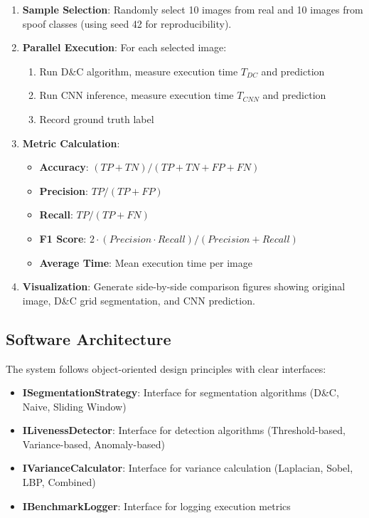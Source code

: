 \documentclass[conference]{IEEEtran}
\begin{document}
\begin{enumerate}
    \item \textbf{Sample Selection}: Randomly select 10 images from real and 10 images from spoof classes (using seed 42 for reproducibility).
    
    \item \textbf{Parallel Execution}: For each selected image:
    \begin{enumerate}
        \item Run D\&C algorithm, measure execution time $T_{DC}$ and prediction
        \item Run CNN inference, measure execution time $T_{CNN}$ and prediction
        \item Record ground truth label
    \end{enumerate}
    
    \item \textbf{Metric Calculation}:
    \begin{itemize}
        \item \textbf{Accuracy}: $(TP + TN) / (TP + TN + FP + FN)$
        \item \textbf{Precision}: $TP / (TP + FP)$
        \item \textbf{Recall}: $TP / (TP + FN)$
        \item \textbf{F1 Score}: $2 \cdot (Precision \cdot Recall) / (Precision + Recall)$
        \item \textbf{Average Time}: Mean execution time per image
    \end{itemize}
    
    \item \textbf{Visualization}: Generate side-by-side comparison figures showing original image, D\&C grid segmentation, and CNN prediction.
\end{enumerate}

\subsection{Software Architecture}

The system follows object-oriented design principles with clear interfaces:

\begin{itemize}
    \item \textbf{ISegmentationStrategy}: Interface for segmentation algorithms (D\&C, Naive, Sliding Window)
    \item \textbf{ILivenessDetector}: Interface for detection algorithms (Threshold-based, Variance-based, Anomaly-based)
    \item \textbf{IVarianceCalculator}: Interface for variance calculation (Laplacian, Sobel, LBP, Combined)
    \item \textbf{IBenchmarkLogger}: Interface for logging execution metrics
\end{itemize}
\end{document}
